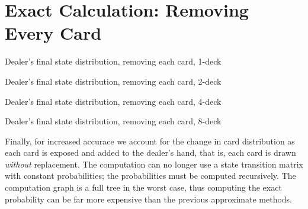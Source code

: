 \section{Exact Calculation: Removing Every Card}
\label{sec:dealer:exact}

\begin{table}[ht!]
\caption{Dealer's final state distribution, removing each card, 1-deck}
\begin{center}

\end{center}
\label{tab:dealer-final-unified-exact-1}
\end{table}

\begin{table}[ht!]
\caption{Dealer's final state distribution, removing each card, 2-deck}
\begin{center}

\end{center}
\label{tab:dealer-final-unified-exact-2}
\end{table}

\begin{table}[ht!]
\caption{Dealer's final state distribution, removing each card, 4-deck}
\begin{center}

\end{center}
\label{tab:dealer-final-unified-exact-4}
\end{table}

\begin{table}[ht!]
\caption{Dealer's final state distribution, removing each card, 8-deck}
\begin{center}

\end{center}
\label{tab:dealer-final-unified-exact-8}
\end{table}

Finally, for increased accurace we account for the change in 
card distribution as each card is exposed and added to the dealer's hand, 
that is, each card is drawn \emph{without} replacement.
The computation can no longer use a state transition matrix with
constant probabilities; 
the probabilities must be computed recursively.
The computation graph is a full tree in the worst case, 
thus computing the exact probability can be far more expensive
than the previous approximate methods.  

